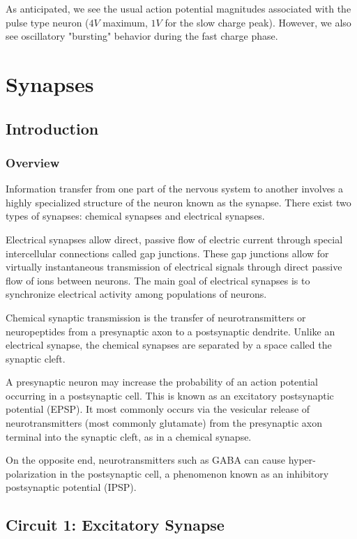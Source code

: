 \documentclass[12]{book}
\newcommand\0{\mathbf{0}}
\newcommand\<{\langle}
\renewcommand\>{\rangle}
\begin{document}
As anticipated, we see the usual action potential magnitudes associated with the pulse type neuron ($4V$ maximum, $1V$ for the slow charge peak). However, we also see oscillatory "bursting" behavior during the fast charge phase.

\chapter{Synapses}

\section{Introduction}

\subsection{Overview}

Information transfer from one part of the nervous system to another involves a highly specialized structure of the neuron known as the synapse. There exist two types of synapses: chemical synapses and electrical synapses. 

Electrical synapses allow direct, passive flow of electric current through special intercellular connections called gap junctions. These gap junctions allow for virtually instantaneous transmission of electrical signals through direct passive flow of ions between neurons. The main goal of electrical synapses is to synchronize electrical activity among populations of neurons. 

Chemical synaptic transmission is the transfer of neurotransmitters or neuropeptides from a presynaptic axon to a postsynaptic dendrite. Unlike an electrical synapse, the chemical synapses are separated by a space called the synaptic cleft.

A presynaptic neuron may increase the probability of an action potential occurring in a postsynaptic cell. This is known as an excitatory postsynaptic potential (EPSP). It most commonly occurs via the vesicular release of neurotransmitters (most commonly glutamate) from the presynaptic axon terminal into the synaptic cleft, as in a chemical synapse.

On the opposite end, neurotransmitters such as GABA can cause hyper-polarization in the postsynaptic cell, a phenomenon known as an inhibitory postsynaptic potential (IPSP).

\section{Circuit 1: Excitatory Synapse}
\end{document}
